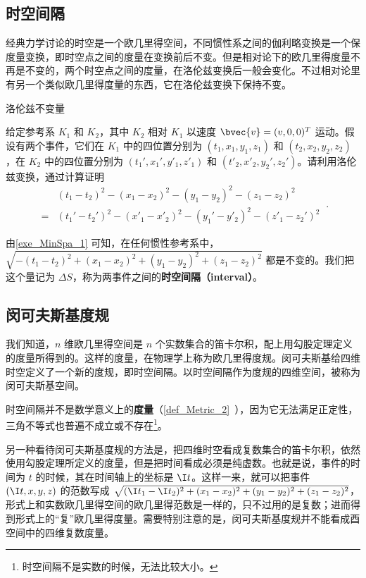 

\subsection{时空间隔}
经典力学讨论的时空是一个欧几里得空间，不同惯性系之间的伽利略变换是一个保度量变换，即时空点之间的度量在变换前后不变。但是相对论下的欧几里得度量不再是不变的，两个时空点之间的度量，在洛伦兹变换后一般会变化。不过相对论里有另一个类似欧几里得度量的东西，它在洛伦兹变换下保持不变。

\begin{exercise}{洛伦兹不变量}\label{exe_MinSpa_1}

给定参考系 $K_1$ 和 $K_2$，其中 $K_2$ 相对 $K_1$ 以速度 $\bvec{v}=(v,0,0)^T$ 运动。假设有两个事件，它们在 $K_1$ 中的四位置分别为 $(t_1, x_1, y_1, z_1)$ 和 $(t_2, x_2, y_2, z_2)$，在 $K_2$ 中的四位置分别为 $(t_1', x_1', y'_1, z'_1)$ 和 $(t'_2, x'_2, y_2', z_2')$。请利用洛伦兹变换，通过计算证明
\begin{equation}
\begin{aligned}
&(t_1-t_2)^2-(x_1-x_2)^2-(y_1-y_2)^2-(z_1-z_2)^2\\=&(t_1'-t_2')^2-(x'_1-x'_2)^2-(y_1'-y'_2)^2-(z'_1-z_2')^2
\end{aligned}~.
\end{equation}
\end{exercise}

由\autoref{exe_MinSpa_1} 可知，在任何惯性参考系中，$\sqrt{-(t_1-t_2)^2+(x_1-x_2)^2+(y_1-y_2)^2+(z_1-z_2)^2}$ 都是不变的。我们把这个量记为 $\Delta S$，称为两事件之间的\textbf{时空间隔（interval）}。

\subsection{闵可夫斯基度规}

我们知道，$n$ 维欧几里得空间是 $n$ 个实数集合的笛卡尔积，配上用勾股定理定义的度量所得到的。这样的度量，在物理学上称为欧几里得度规。闵可夫斯基给四维时空定义了一个新的度规，即时空间隔。以时空间隔作为度规的四维空间，被称为闵可夫斯基空间。

时空间隔并不是数学意义上的\textbf{度量}（\autoref{def_Metric_2}~），因为它无法满足正定性，三角不等式也普遍不成立或不存在\footnote{时空间隔不是实数的时候，无法比较大小。}。

另一种看待闵可夫斯基度规的方法是，把四维时空看成复数集合的笛卡尔积，依然使用勾股定理所定义的度量，但是把时间看成必须是纯虚数。也就是说，事件的时间为 $t$ 的时候，其在时间轴上的坐标是 $\I t$。这样一来，就可以把事件 $(\I t, x, y, z)$ 的范数写成 $\sqrt{(\I t_1-\I t_2)^2+(x_1-x_2)^2+(y_1-y_2)^2+(z_1-z_2)^2}$，形式上和实数欧几里得空间的欧几里得范数是一样的，只不过用的是复数；进而得到形式上的“复”欧几里得度量。需要特别注意的是，闵可夫斯基度规并不能看成酉空间中的四维复数度量。

